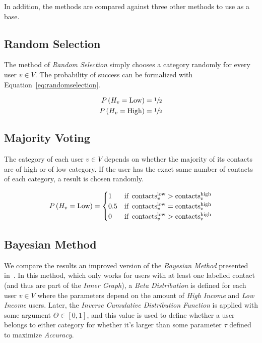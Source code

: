 In addition, the methods are compared against three other methods to use as a base.



\subsection{Random Selection}

The method of \emph{Random Selection} simply chooses a category randomly for every user $v \in V$. The probability of success can be formalized with Equation~\ref{eq:randomselection}.

\begin{equation}
\label{eq:randomselection}
\begin{aligned}
	P \left( H_v = \text{Low} \right) &= \sfrac{1}{2} \\
	P \left( H_v = \text{High} \right) &= \sfrac{1}{2}
\end{aligned}
\end{equation}

\subsection{Majority Voting}

The category of each user $v \in V$ depends on whether the majority of its contacts are of high or of low category. If the user has the exact same number of contacts of each category, a result is chosen randomly.

\begin{equation}
\label{eq:majorityvoting}
	P \left( H_v = \text{Low} \right) =
	\begin{cases}
		1 & \text{if} \ \operatorname{contacts}^{\operatorname{low}}_v > \operatorname{contacts}^{\operatorname{high}}_v \\
		0.5 & \text{if} \ \operatorname{contacts}^{\operatorname{low}}_v = \operatorname{contacts}^{\operatorname{high}}_v \\
		0 & \text{if} \ \operatorname{contacts}^{\operatorname{low}}_v > \operatorname{contacts}^{\operatorname{high}}_v
	\end{cases}
\end{equation}

\subsection{Bayesian Method}

We compare the results an improved version of the \emph{Bayesian Method} presented in~\cite{fixmanasonam2016}. In this method, which only works for users with at least one labelled contact (and thus are part of the \emph{Inner Graph}), a \emph{Beta Distribution} is defined for each user $v \in V$ where the parameters depend on the amount of \emph{High Income} and \emph{Low Income} users. Later, the \emph{Inverse Cumulative Distribution Function} is applied with some argument $\Theta \in \left[ 0, 1 \right]$, and this value is used to define whether a user belongs to either category for whether it's larger than some parameter $\tau$ defined to maximize \emph{Accuracy}.


